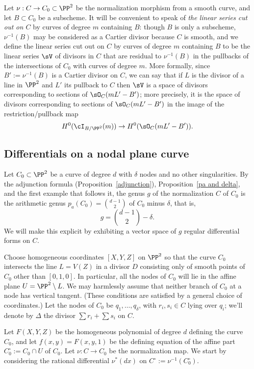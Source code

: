 Let $\nu: C\to C_{0}\subset \PP^{2}$ be the normalization morphism from a smooth curve,
and let $B\subset C_{0}$ be a subscheme.
It will be convenient to speak of \emph{the linear series cut out on $C$} by curves of degree $m$
containing $B$: though $B$ is only a subscheme, $\nu^{-1}(B)$ may be considered as a Cartier divisor because
$C$ is smooth, and we define
the linear series cut out on $C$ by curves of degree $m$
containing $B$ to be
the linear series  $\sV$ of divisors in $C$ that are residual to $\nu^{-1}(B)$ in the pullbacks 
of the intersections of $C_{0}$ with curves of degree $m$. More formally, since $B' := \nu^{-1}(B)$
is a Cartier divisor on $C$, we can say that if $L$ is the divisor of a line in $\PP^{2}$ and $L'$
its pullback to $C$ then
$\sV$ is a space of divisors corresponding to
sections of $\sO_{C}(mL'-B')$; more precisely, it is the space of divisors corresponding to
sections of $\sO_{C}(mL'-B')$ in the image of the restriction/pullback map
$$
H^0(\cI_{B/\PP^2}(m)) \to H^0(\sO_{C}(mL'-B')).
$$

\subsection{Differentials on a nodal plane curve}\label{canonical series on nodal plane curves}

Let $C_{0} \subset \PP^2$  be a curve of degree $d$ with $\delta$ nodes and no other singularities. By the adjunction
formula (Proposition~\ref{adjunction}), Proposition~\ref{pa and delta}, and the first example that follows it, 
the genus $g$ of the normalization $C$ of $C_{0}$ is
the arithmetic genus $p_{a}(C_{0}) = \binom{d-1}{2}$ of $C_{0}$ minus $\delta$, that is,
$$
g = \binom{d-1}{2} -\delta.
$$
We will make this explicit by exhibiting a vector space of $g$ regular differential forms on $C$.

Choose homogeneous coordinates  $[X,Y,Z]$ on $\PP^2$ so that the curve $C_0$ intersects the line $L = V(Z)$ in a divisor $D$ consisting only of smooth points of $C_{0}$  other than $[0,1,0]$. In particular,  all the nodes of $C_0$ will lie in the affine plane $U = \PP^2 \setminus L$.
We may harmlessly assume that  neither branch of $C_0$ at a node has vertical tangent. (These conditions are satisfied by a general choice of coordinates.) Let the nodes of $C_0$ be $q_1,\dots,q_\delta$, with $r_i, s_i \in C$ lying over $q_i$; we'll denote by $\Delta$ the divisor $\sum r_i + \sum s_i$ on $C$.

Let $F(X,Y,Z)$ be the homogeneous polynomial of degree $d$ defining the curve $C_0$, and let $f(x,y) = F(x,y,1)$ be the defining equation of the affine part $C_{0}^{\circ}:= C_0 \cap U$ of $C_0$. Let $\nu: C\to C_0$ be the normalization map. We start by considering the rational differential 
$\nu^*(dx)$ on 
$C^{\circ}:= \nu^{-1}(C_{0}^{\circ})$. 

